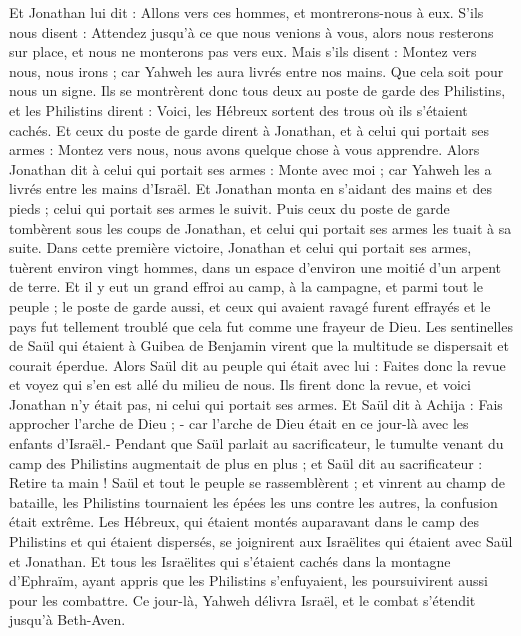 \begin{multicols}{2}
Et Jonathan lui dit : Allons vers ces hommes, et montrerons-nous à eux.
S'ils nous disent : Attendez jusqu'à ce que nous venions à vous, alors nous resterons sur place, et nous ne monterons pas vers eux.
Mais s'ils disent : Montez vers nous, nous irons ; car Yahweh les aura livrés entre nos mains. Que cela soit pour nous un signe.
Ils se montrèrent donc tous deux au poste de garde des Philistins, et les Philistins dirent : Voici, les Hébreux sortent des trous où ils s'étaient cachés.
Et ceux du poste de garde dirent à Jonathan, et à celui qui portait ses armes : Montez vers nous, nous avons quelque chose à vous apprendre. Alors Jonathan dit à celui qui portait ses armes : Monte avec moi ; car Yahweh les a livrés entre les mains d'Israël.
Et Jonathan monta en s’aidant des mains et des pieds ; celui qui portait ses armes le suivit. Puis ceux du poste de garde tombèrent sous les coups de Jonathan, et celui qui portait ses armes les tuait à sa suite.
Dans cette première victoire, Jonathan et celui qui portait ses armes, tuèrent environ vingt hommes, dans un espace d'environ une moitié d’un arpent de terre.
Et il y eut un grand effroi au camp, à la campagne, et parmi tout le peuple ; le poste de garde aussi, et ceux qui avaient ravagé furent effrayés et le pays fut tellement troublé que cela fut comme une frayeur de Dieu.
Les sentinelles de Saül qui étaient à Guibea de Benjamin virent que la multitude se dispersait et courait éperdue.
Alors Saül dit au peuple qui était avec lui : Faites donc la revue et voyez qui s’en est allé du milieu de nous. Ils firent donc la revue, et voici Jonathan n'y était pas, ni celui qui portait ses armes.
Et Saül dit à Achija : Fais approcher l'arche de Dieu ; - car l'arche de Dieu était en ce jour-là avec les enfants d'Israël.-
Pendant que Saül parlait au sacrificateur, le tumulte venant du camp des Philistins augmentait de plus en plus ; et Saül dit au sacrificateur : Retire ta main !
Saül et tout le peuple se rassemblèrent ; et vinrent au champ de bataille, les Philistins tournaient les épées les uns contre les autres, la confusion était extrême.
Les Hébreux, qui étaient montés auparavant dans le camp des Philistins et qui étaient dispersés, se joignirent aux Israëlites qui étaient avec Saül et Jonathan.
Et tous les Israëlites qui s'étaient cachés dans la montagne d'Ephraïm, ayant appris que les Philistins s'enfuyaient, les poursuivirent aussi pour les combattre.
Ce jour-là, Yahweh délivra Israël, et le combat s’étendit jusqu'à Beth-Aven.

\end{multicols}
